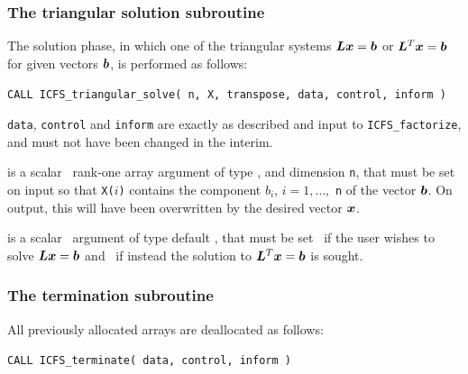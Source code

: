 \documentclass{galahad}
\newcommand{\packagename}{ICFS}
\begin{document}

\subsubsection{The triangular solution subroutine}

The solution phase, in which one of the triangular systems
${\bm{L}} {\bm{x}} = {\bm{b}}$ or ${\bm{L}}^T {\bm{x}} = {\bm{b}}$ for given vectors ${\bm{b}}$,
is performed as follows:
\vspace*{1mm}

\hspace{8mm}
{\tt CALL \packagename\_triangular\_solve( n, X, transpose, data, control, inform )}
\vspace*{-1mm}

\begin{description}
 {\tt data}, {\tt control} and {\tt inform} are
exactly as described and input to {\tt \packagename\_factorize},
and must not have been changed in the interim.

 is a scalar \intentinout\ rank-one array argument of type
\realdp, and dimension {\tt n}, that  must be set on input so that
{\tt X(}$i${\tt)} contains the component $b_i$, $i = 1, \ldots,$ {\tt n}
of the vector ${\bm{b}}$. On output, this will have been overwritten by the
desired vector ${\bm{x}}$.

 is a scalar \intentin\ argument of type
default \logical, that must be set \false\ if the user wishes to solve
${\bm{L}} {\bm{x}} = {\bm{b}}$ and \true\ if instead the solution to ${\bm{L}}^T {\bm{x}} = {\bm{b}}$
is sought.

\end{description}


\subsubsection{The  termination subroutine}
All previously allocated arrays are deallocated as follows:
\vspace*{1mm}

\hspace{8mm}
{\tt CALL \packagename\_terminate( data, control, inform )}
\end{document}

